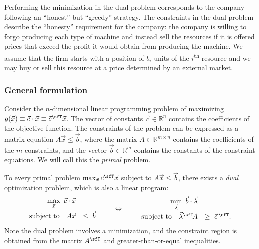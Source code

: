 \documentclass[11pt,oneside]{article}
\begin{document}
			\noindent
			Performing the minimization in the dual problem corresponds to the company following an ``honest'' but ``greedy'' strategy.
			The constraints in the dual problem describe the ``honesty'' requirement for the company:
			the company is willing to forgo producing each type of machine
			and instead sell the resources if it is offered prices that exceed the profit it would obtain from producing the machine.
			We assume that the firm starts with a position of $b_i$ units of the $i$\textsuperscript{th} resource
			and we may buy or sell this resource at a price determined by an external market.


		\subsubsection{General formulation}
		
			Consider the $n$-dimensional linear programming problem of maximizing $g(\vec{x}) \equiv \vec{c} \cdot \vec{x} \equiv  \vec{c}^\sfT \vec{x}$.
			The vector of constants $\vec{c} \in \mathbb{R}^n$ contains the coefficients of the objective function.
			The constraints of the problem can be expressed as a matrix equation $A\vec{x} \leq \vec{b}$,
			where the matrix $A \in \mathbb{R}^{m\times n}$ contains the coefficients of the $m$ constraints,
			and the vector $\vec{b} \in \mathbb{R}^m$ contains the constants of the constraint equations.
			We will call this the \emph{primal} problem.
			
			To every primal problem  $\max_{\vec{x}} \vec{c}^\sfT \vec{x}$ subject to $A\vec{x} \leq \vec{b}$,
			there exists a \emph{dual} optimization problem, which is also a linear program:
			\[
				\begin{array}{rl}
				\displaystyle \max_{\vec{x}} \  \vec{c} \cdot \vec{x} &  \\[3mm]
				\textrm{subject to } \ \ 
						A\vec{x} &\leq \		\vec{b}
				\end{array}
			\qquad
			\Leftrightarrow
			\qquad
				\begin{array}{rl}
				\displaystyle \min_{\vec{\lambda}} \ \vec{b} \cdot \vec{\lambda} &  \\[3mm]
				\textrm{subject to  } \ \ 
						\vec{\lambda}^\sfT \!A &\geq \		\vec{c}^{\,\sfT}.
				\end{array}
			\]
			Note the dual problem involves a minimization,
			and the constraint region is obtained from the matrix $A^\sfT$ and greater-than-or-equal inequalities.
			
\end{document}
